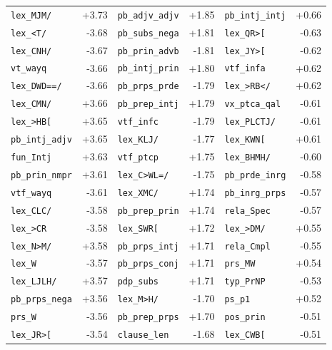 \begin{longtable}{lrlrlr}
\texttt{lex\_MJM/} & +3.73 & \texttt{pb\_adjv\_adjv} & +1.85 & \texttt{pb\_intj\_intj} & +0.66 \\
\texttt{lex\_\textless{}T/} & -3.68 & \texttt{pb\_subs\_nega} & +1.81 & \texttt{lex\_QR\textgreater{}[} & -0.63 \\
\texttt{lex\_CNH/} & -3.67 & \texttt{pb\_prin\_advb} & -1.81 & \texttt{lex\_JY\textgreater{}[} & -0.62 \\
\texttt{vt\_wayq} & -3.66 & \texttt{pb\_intj\_prin} & +1.80 & \texttt{vtf\_infa} & +0.62 \\
\texttt{lex\_DWD==/} & -3.66 & \texttt{pb\_prps\_prde} & -1.79 & \texttt{lex\_\textgreater{}RB\textless{}/} & +0.62 \\
\texttt{lex\_CMN/} & +3.66 & \texttt{pb\_prep\_intj} & +1.79 & \texttt{vx\_ptca\_qal} & -0.61 \\
\texttt{lex\_\textgreater{}HB[} & +3.65 & \texttt{vtf\_infc} & -1.79 & \texttt{lex\_PLCTJ/} & -0.61 \\
\texttt{pb\_intj\_adjv} & +3.65 & \texttt{lex\_KLJ/} & -1.77 & \texttt{lex\_KWN[} & +0.61 \\
\texttt{fun\_Intj} & +3.63 & \texttt{vtf\_ptcp} & +1.75 & \texttt{lex\_BHMH/} & -0.60 \\
\texttt{pb\_prin\_nmpr} & +3.61 & \texttt{lex\_C\textgreater{}WL=/} & -1.75 & \texttt{pb\_prde\_inrg} & -0.58 \\
\texttt{vtf\_wayq} & -3.61 & \texttt{lex\_XMC/} & +1.74 & \texttt{pb\_inrg\_prps} & -0.57 \\
\texttt{lex\_CLC/} & -3.58 & \texttt{pb\_prep\_prin} & +1.74 & \texttt{rela\_Spec} & -0.57 \\
\texttt{lex\_\textgreater{}CR} & -3.58 & \texttt{lex\_SWR[} & +1.72 & \texttt{lex\_\textgreater{}DM/} & +0.55 \\
\texttt{lex\_N\textgreater{}M/} & +3.58 & \texttt{pb\_prps\_intj} & +1.71 & \texttt{rela\_Cmpl} & -0.55 \\
\texttt{lex\_W} & -3.57 & \texttt{pb\_prps\_conj} & +1.71 & \texttt{prs\_MW} & +0.54 \\
\texttt{lex\_LJLH/} & +3.57 & \texttt{pdp\_subs} & +1.71 & \texttt{typ\_PrNP} & -0.53 \\
\texttt{pb\_prps\_nega} & +3.56 & \texttt{lex\_M\textgreater{}H/} & -1.70 & \texttt{ps\_p1} & +0.52 \\
\texttt{prs\_W} & -3.56 & \texttt{pb\_prep\_prps} & +1.70 & \texttt{pos\_prin} & -0.51 \\
\texttt{lex\_JR\textgreater{}[} & -3.54 & \texttt{clause\_len} & -1.68 & \texttt{lex\_CWB[} & -0.51 \\

\end{longtable}
